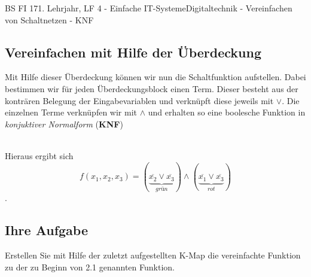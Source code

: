 \documentclass[11pt,twocolumn,oneside,openany,headings=optiontotoc,11pt,numbers=noenddot]{article}
\begin{document}
\begin{worksheet}{BS FI 17}{1. Lehrjahr, LF 4 - Einfache IT-Systeme}{Digitaltechnik - Vereinfachen von Schaltnetzen - KNF}
		\subsection{Vereinfachen mit Hilfe der Überdeckung}
		Mit Hilfe dieser Überdeckung können wir nun die Schaltfunktion aufstellen. Dabei bestimmen wir für jeden Überdeckungsblock einen Term. Dieser besteht aus der konträren Belegung der Eingabevariablen und verknüpft diese jeweils mit \(\lor\). Die einzelnen Terme verknüpfen wir mit \(\land\) und erhalten so eine boolesche Funktion in \textit{konjuktiver Normalform} (\textbf{KNF})
		\begin{karnaugh-map}[4][2][1][$x_2x_3$][$x_1$]
		\end{karnaugh-map}\\
		Hieraus ergibt sich \[f(x_1,x_2,x_3) = (\underbrace{\overline{x_2}\lor\overline{x_3}}_{grün}) \land (\underbrace{\overline{x_1}\lor\overline{x_3}}_{rot})\].\\
		\subsection*{Ihre Aufgabe} Erstellen Sie mit Hilfe der zuletzt aufgestellten K-Map die vereinfachte Funktion zu der zu Beginn von 2.1 genannten Funktion.\\
	\end{worksheet}
\end{document}
